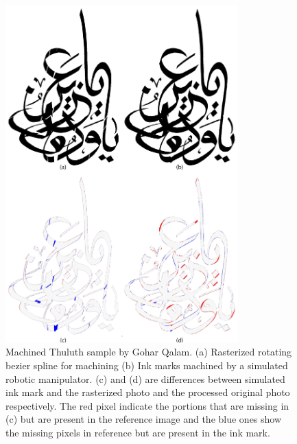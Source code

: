 {\begin{figure}[H]
  \centering
  \includegraphics[width=0.8\textwidth]{../Images/Thuluth_Machined.pdf}
  \caption
  {
      Machined Thuluth sample by Gohar Qalam. (a) Rasterized rotating bezier spline for machining (b) Ink marks machined by a simulated robotic manipulator. (c) and (d) are differences between simulated ink mark and the rasterized photo and the processed original photo respectively. The red pixel indicate the portions that are missing in (c) but are present in the reference image and the blue ones show the missing pixels in reference but are present in the ink mark.
  }
\end{figure}
}
